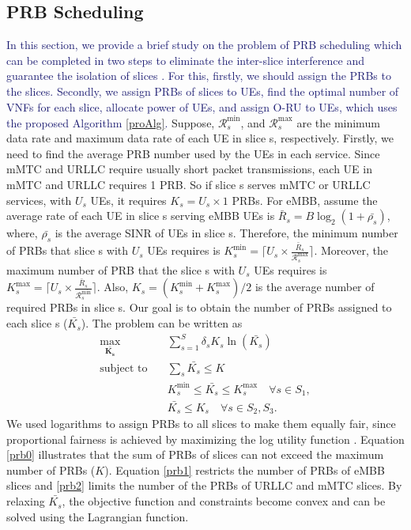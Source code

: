 \documentclass[lettersize,journal]{IEEEtran}
\begin{document}
\subsection{PRB Scheduling}\label{prb}
\textcolor{MidnightBlue}{In this section, we provide a brief study on the problem of PRB scheduling which can be completed in two steps to eliminate the inter-slice interference and guarantee the isolation of slices \cite{marabissi2019highly}.
For this, firstly, we should assign the PRBs to the slices. Secondly, we assign PRBs of slices to UEs, find the optimal number of VNFs for each slice, allocate power of UEs, and assign O-RU to UEs, which uses the proposed Algorithm \ref{proAlg}.}
Suppose, $\mathcal{R}_{{s}}^{\min}$, and $\mathcal{R}_{{s}}^{\text{max}}$ are the minimum data rate and maximum data rate of each UE in slice s, respectively.
Firstly, we need to find the average PRB number used by the UEs in each service. Since mMTC and URLLC require usually short packet transmissions, each UE in mMTC and URLLC requires 1 PRB. So if slice s serves mMTC or URLLC services, with $U_s$ UEs, it requires $K_s = U_s \times 1$ PRBs. For eMBB, assume the average rate of each UE in slice s serving eMBB UEs is $\bar{R}_s = B\log_2(1 + \bar{\rho_s})$, where, $\bar{\rho_s}$ is the average SINR of UEs in slice s. 
Therefore, the minimum number of PRBs that slice s with $U_s$ UEs requires is $K_s^{\min} = \lceil{U_s \times \frac{\bar{R}_s}{\mathcal{R}_{{s}}^{\text{max}}}}\rceil$. 
Moreover, the maximum number of PRB that the slice s with $U_s$ UEs requires is $K_s^{\text{max}} = \lceil{U_s \times \frac{\bar{R}_s}{\mathcal{R}_{{s}}^{\min}}}\rceil$. Also, $K_s = (K_s^{\min}+K_s^{\text{max}})/2$ is the average number of required PRBs in slice s.
Our goal is to obtain the number of PRBs assigned to each slice s ($\bar{K_s}$).
The problem can be written as
\begin{subequations}\label{prob:prb}
\begin{alignat}{4}
\max\limits_{\boldsymbol{\bar{K_s}}} \quad &  \sum_{s=1}^{S}\delta_s K_s \ln(\bar{K_s}) \ \\
\text{subject to} \quad  & \sum_s{\bar{K_s}} \leq K
 \label{prb0} \\
& K_s^{\min} \leq \bar{K_s}  \leq K_s^{\text{max}}  \quad \forall s \in S_1,\label{prb1} \\
&  \bar{K_s} \leq K_s  \quad \forall s \in S_2, S_3.\label{prb2}
\end{alignat}
\label{constraints}
\end{subequations}
We used logarithms to assign PRBs to all slices to make them equally fair, since proportional fairness is achieved by maximizing the log utility function \cite{marabissi2019highly}.
Equation \eqref{prb0} illustrates that the sum of PRBs of slices can not exceed the maximum number of PRBs ($K$).
Equation \eqref{prb1} restricts the number of PRBs of eMBB slices and \eqref{prb2} limits the number of the PRBs of URLLC and mMTC slices. By relaxing $\bar{K_s}$, the objective function and constraints become convex and can be solved using the Lagrangian function.
\end{document}
